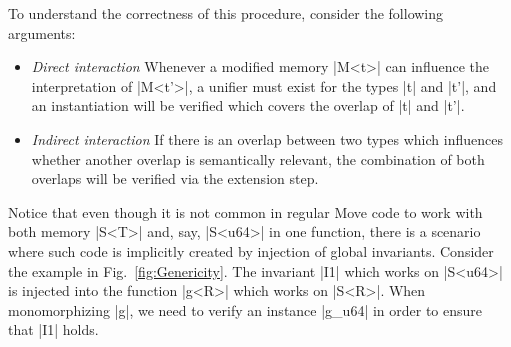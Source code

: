 To understand the correctness of this procedure, consider the following arguments:

\begin{itemize}
\item \emph{Direct interaction} Whenever a modified memory |M<t>| can influence
  the interpretation of |M<t'>|, a unifier must exist for the types |t| and |t'|,
  and an instantiation will be verified which covers the overlap of |t| and
  |t'|.
\item \emph{Indirect interaction} If there is an overlap between two types
  which influences whether another overlap is semantically relevant, the
  combination of both overlaps will be verified via the extension step.
\end{itemize}

Notice that even though it is not common in regular Move code to work with both
memory |S<T>| and, say, |S<u64>| in one function, there is a scenario where such
code is implicitly created by injection of global invariants. Consider the
example in Fig.~\ref{fig:Genericity}. The invariant |I1| which works on |S<u64>|
is injected into the function |g<R>| which works on |S<R>|. When monomorphizing
|g|, we need to verify an instance |g_u64| in order to ensure that |I1| holds.



